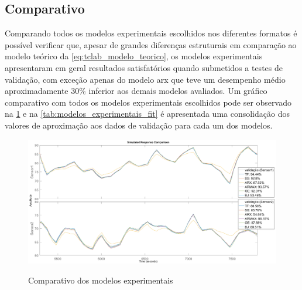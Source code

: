 \subsection{Comparativo}
\label{subsec:modelos_experimentais_comparativo}

Comparando todos os modelos experimentais escolhidos nos diferentes formatos é possível verificar que,
apesar de grandes diferenças estruturais em comparação ao modelo teórico da \cref{eq:tclab_modelo_teorico}, os
modelos experimentais apresentaram em geral resultados satisfatórios quando submetidos a testes de validação,
com exceção apenas do modelo \acrshort{arx} que teve um desempenho médio aproximadamente $30\%$ inferior
aos demais modelos avaliados.
Um gráfico comparativo com todos os modelos experimentais escolhidos pode ser observado na 
\cref{fig:comparativo_modelos_experimentais} e na \cref{tab:modelos_experimentais_fit} é apresentada uma
consolidação dos valores de aproximação aos dados de validação para cada um dos modelos. 

\begin{figure}[h]
	\caption{Comparativo dos modelos experimentais}
	\begin{center}
		\includegraphics[width=1.00\textwidth]{./5_images/tclabsp-models-ALL-compare.png} 
		\label{fig:comparativo_modelos_experimentais}
	\end{center}
	\centering
\end{figure}

